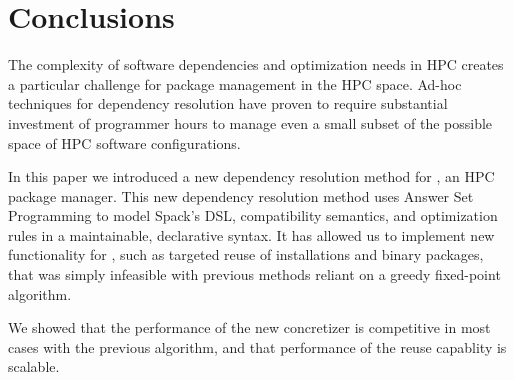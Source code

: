 \section{Conclusions}
\label{sec:conclusions}

The complexity of software dependencies and optimization needs in HPC creates a
particular challenge for package management in the HPC space. Ad-hoc techniques for
dependency resolution have proven to require substantial investment of programmer hours
to manage even a small subset of the possible space of HPC software configurations.

In this paper we introduced a new dependency resolution method for \spack{}, an HPC
package manager. This new dependency resolution method uses Answer Set Programming to
model Spack's DSL, compatibility semantics, and optimization rules in a maintainable,
declarative syntax. It has allowed us to implement new functionality for \spack{}, such
as targeted reuse of installations and binary packages, that was simply infeasible with
previous methods reliant on a greedy fixed-point algorithm.

We showed that the performance of the new concretizer is competitive in most cases with
the previous algorithm, and that performance of the reuse capablity is scalable.

